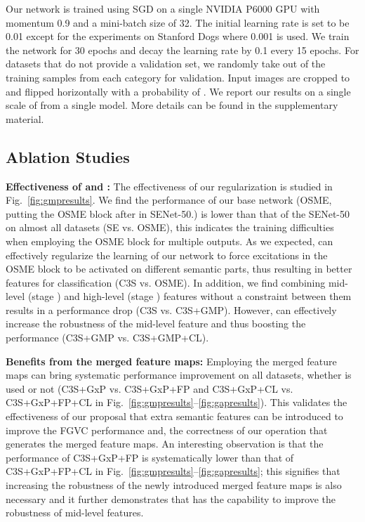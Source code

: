 \documentclass[10pt,twocolumn,letterpaper]{article}
\begin{document}
Our network is trained using SGD on a single NVIDIA P6000 GPU with momentum 0.9 and a mini-batch size of 32. The initial learning rate is set to be 0.01 except for the experiments on Stanford Dogs where 0.001 is used. We train the network for 30 epochs and decay the learning rate by 0.1 every 15 epochs. For datasets that do not provide a validation set, we randomly take  out of the training samples from each category for validation. Input images are cropped to  and flipped horizontally with a probability of . We report our results on a single scale of  from a single model. More details can be found in the supplementary material.





\subsection{Ablation Studies}
\label{sec:ablation}
\textbf{Effectiveness of  and :} The effectiveness of our regularization is studied in Fig.~\ref{fig:gmpresults}. We find the performance of our base network (OSME, putting the OSME block after  in SENet-50.) is lower than that of the SENet-50 on almost all datasets (SE vs. OSME), this indicates the training difficulties when employing the OSME block for multiple outputs. As we expected,  can effectively regularize the learning of our network to force excitations in the OSME block to be activated on different semantic parts, thus resulting in better features for classification (C3S vs. OSME). In addition, we find combining mid-level (stage ) and high-level (stage ) features without a constraint between them results in a performance drop (C3S vs. C3S+GMP). 
However,  can effectively increase the robustness of the mid-level feature and thus boosting the performance (C3S+GMP vs. C3S+GMP+CL).


\textbf{Benefits from the merged feature maps:} Employing the merged feature maps can bring systematic performance improvement on all datasets, whether  is used or not (C3S+GxP vs. C3S+GxP+FP and C3S+GxP+CL vs. C3S+GxP+FP+CL in Fig.~\ref{fig:gmpresults}--\ref{fig:gapresults}). This validates the effectiveness of our proposal that extra semantic features can be introduced to improve the FGVC performance and, the correctness of our operation that generates the merged feature maps. An interesting observation is that the performance of C3S+GxP+FP is systematically lower than that of C3S+GxP+FP+CL in Fig.~\ref{fig:gmpresults}--\ref{fig:gapresults}; this signifies that increasing the robustness of the newly introduced merged feature maps is also necessary and it further demonstrates that  has the capability to improve the robustness of mid-level features.    
\end{document}
